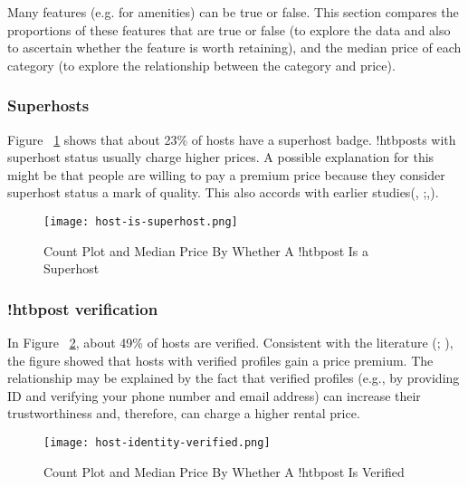 Many features (e.g. for amenities) can be true or false. This section compares
the proportions of these features that are true or false (to explore the data
and also to ascertain whether the feature is worth retaining), and the median
price of each category (to explore the relationship between the category and
price).

\subsubsection*{Superhosts}

Figure ~\ref{fig:host_is_superhost} shows that about 23\% of hosts have a
superhost badge. !htbposts with superhost status usually charge higher prices. A
possible explanation for this might be that people are willing to pay a premium
price because they consider superhost status a mark of quality.  This also
accords with earlier studies(\cite{gibbs2018use},
\cite{kakar2016effects};\cite{wang2017price},\cite{cai2019price}).

\begin{figure}[!htbp]\centering
    \texttt{[image: host-is-superhost.png]}
    \caption{Count Plot and Median Price By Whether A !htbpost Is a Superhost}
    \label{fig:host_is_superhost}
\end{figure}

\subsubsection*{!htbpost verification}
In Figure ~\ref{fig:host_identity_verified}, about 49\% of hosts are verified.
Consistent with the literature (\cite{chen2017consumer}; \cite{wang2017price}),
the figure showed that hosts with verified profiles gain a price premium. The
relationship may be explained by the fact that verified profiles (e.g., by
providing ID and verifying your phone number and email address)  can increase
their trustworthiness and, therefore, can charge a higher rental price.

\begin{figure}[!htbp]\centering
    \texttt{[image: host-identity-verified.png]}
    \caption{Count Plot and Median Price By Whether A !htbpost Is Verified}
    \label{fig:host_identity_verified}
\end{figure}


